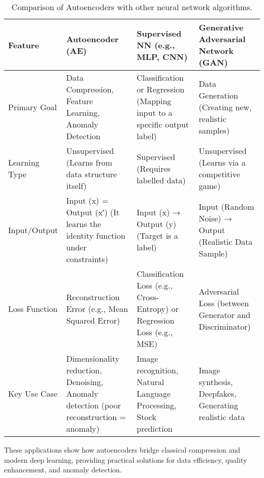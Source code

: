 \begin{table}[htbp]
\centering
\begin{tabularx}{0.9\textwidth}{p{} *{3}{X}}
\toprule
Feature & Autoencoder (AE) & Supervised NN (e.g., MLP, CNN) & Generative Adversarial Network (GAN) \\
\midrule
Primary Goal & Data Compression, Feature Learning, Anomaly Detection & Classification or Regression (Mapping input to a specific output label) & Data Generation (Creating new, realistic samples) \\
Learning Type & Unsupervised (Learns from data structure itself) & Supervised (Requires labelled data) & Unsupervised (Learns via a competitive game) \\
Input/Output & Input (x) = Output (x′) (It learns the identity function under constraints) & Input (x) → Output (y) (Target is a label) & Input (Random Noise) → Output (Realistic Data Sample) \\
Loss Function & Reconstruction Error (e.g., Mean Squared Error) & Classification Loss (e.g., Cross-Entropy) or Regression Loss (e.g., MSE) & Adversarial Loss (between Generator and Discriminator) \\
Key Use Case & Dimensionality reduction, Denoising, Anomaly detection (poor reconstruction = anomaly) & Image recognition, Natural Language Processing, Stock prediction & Image synthesis, Deepfakes, Generating realistic data \\
\bottomrule
\end{tabularx}
\caption{Comparison of Autoencoders with other neural network algorithms.}
\label{tab:autoencoder-comparison}
\end{table}

These applications show how autoencoders bridge classical compression and modern deep learning, providing practical solutions for data efficiency, quality enhancement, and anomaly detection.

